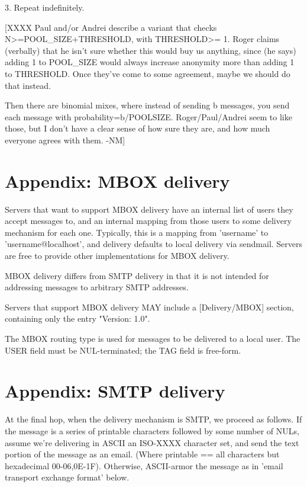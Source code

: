 3. Repeat indefinitely.

[XXXX 
   Paul and/or Andrei describe a variant that checks N>=POOL_SIZE+THRESHOLD, 
   with THRESHOLD>= 1.  Roger claims (verbally) that he isn't sure whether
   this would buy us anything, since (he says) adding 1 to POOL_SIZE would
   always increase anonymity more than adding 1 to THRESHOLD.  Once they've
   come to some agreement, maybe we should do that instead.

   Then there are binomial mixes, where instead of sending b messages,
   you send each message with probability=b/POOLSIZE.  Roger/Paul/Andrei
   seem to like those, but I don't have a clear sense of how sure they are,
   and how much everyone agrees with them. -NM]
  
\section{Appendix: MBOX delivery}

Servers that want to support MBOX delivery have an internal list of
users they accept messages to, and an internal mapping from those
users to some delivery mechanism for each one.  Typically, this is a
mapping from 'username' to 'username@localhost', and delivery defaults
to local delivery via sendmail.  Servers are free to provide other
implementations for MBOX delivery.

MBOX delivery differs from SMTP delivery in that it is not intended
for addressing messages to arbitrary SMTP addresses.

Servers that support MBOX delivery MAY include a [Delivery/MBOX]
section, containing only the entry "Version: 1.0".

The MBOX routing type is used for messages to be delivered to a local
user.  The USER field must be NUL-terminated; the TAG field is
free-form. 

\section{Appendix: SMTP delivery}

At the final hop, when the delivery mechanism is SMTP, we proceed as
follows.  If the message is a series of printable characters followed
by some number of NULs, assume we're delivering in ASCII an ISO-XXXX
character set, and send the text portion of the message as an email.
(Where printable == {all characters but hexadecimal 00-06,0E-1F}).
Otherwise, ASCII-armor the message as in 'email transport exchange
format' below.

